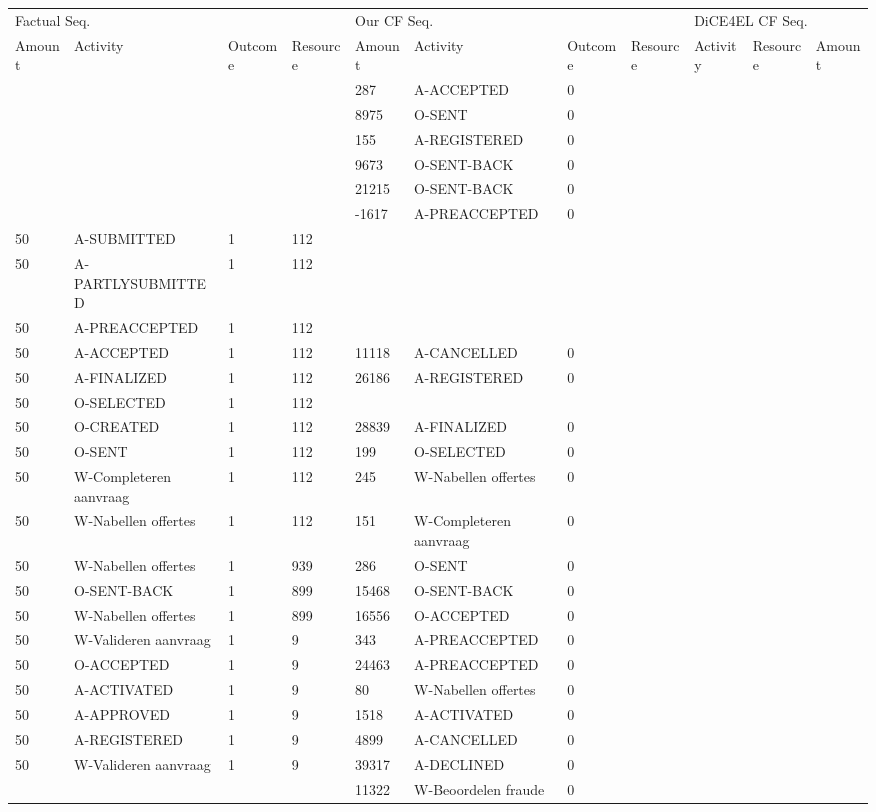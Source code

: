 \begin{tabular}{lllllllllll}
\toprule
\multicolumn{4}{l}{Factual Seq.} & \multicolumn{4}{l}{Our CF Seq.} & \multicolumn{3}{l}{DiCE4EL CF Seq.} \\
Amount & Activity & Outcome & Resource & Amount & Activity & Outcome & Resource & Activity & Resource & Amount \\
\midrule
 &  &  &  & 287 & A-ACCEPTED & 0 &  &  &  &  \\
 &  &  &  & 8975 & O-SENT & 0 &  &  &  &  \\
 &  &  &  & 155 & A-REGISTERED & 0 &  &  &  &  \\
 &  &  &  & 9673 & O-SENT-BACK & 0 &  &  &  &  \\
 &  &  &  & 21215 & O-SENT-BACK & 0 &  &  &  &  \\
 &  &  &  & -1617 & A-PREACCEPTED & 0 &  &  &  &  \\
50 & A-SUBMITTED & 1 & 112 &  &  &  &  &  &  &  \\
50 & A-PARTLYSUBMITTED & 1 & 112 &  &  &  &  &  &  &  \\
50 & A-PREACCEPTED & 1 & 112 &  &  &  &  &  &  &  \\
50 & A-ACCEPTED & 1 & 112 & 11118 & A-CANCELLED & 0 &  &  &  &  \\
50 & A-FINALIZED & 1 & 112 & 26186 & A-REGISTERED & 0 &  &  &  &  \\
50 & O-SELECTED & 1 & 112 &  &  &  &  &  &  &  \\
50 & O-CREATED & 1 & 112 & 28839 & A-FINALIZED & 0 &  &  &  &  \\
50 & O-SENT & 1 & 112 & 199 & O-SELECTED & 0 &  &  &  &  \\
50 & W-Completeren aanvraag & 1 & 112 & 245 & W-Nabellen offertes & 0 &  &  &  &  \\
50 & W-Nabellen offertes & 1 & 112 & 151 & W-Completeren aanvraag & 0 &  &  &  &  \\
50 & W-Nabellen offertes & 1 & 939 & 286 & O-SENT & 0 &  &  &  &  \\
50 & O-SENT-BACK & 1 & 899 & 15468 & O-SENT-BACK & 0 &  &  &  &  \\
50 & W-Nabellen offertes & 1 & 899 & 16556 & O-ACCEPTED & 0 &  &  &  &  \\
50 & W-Valideren aanvraag & 1 & 9 & 343 & A-PREACCEPTED & 0 &  &  &  &  \\
50 & O-ACCEPTED & 1 & 9 & 24463 & A-PREACCEPTED & 0 &  &  &  &  \\
50 & A-ACTIVATED & 1 & 9 & 80 & W-Nabellen offertes & 0 &  &  &  &  \\
50 & A-APPROVED & 1 & 9 & 1518 & A-ACTIVATED & 0 &  &  &  &  \\
50 & A-REGISTERED & 1 & 9 & 4899 & A-CANCELLED & 0 &  &  &  &  \\
50 & W-Valideren aanvraag & 1 & 9 & 39317 & A-DECLINED & 0 &  &  &  &  \\
 &  &  &  & 11322 & W-Beoordelen fraude & 0 &  &  &  &  \\
\bottomrule
\end{tabular}
